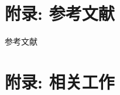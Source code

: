 \appendix

\section{附录: 参考文献}

\begin{frame}[t, allowframebreaks]{参考文献}
\renewcommand*{\bibfont}{\footnotesize}
  \nocite{*}
  \printbibliography
\end{frame}
\section{附录: 相关工作}
\hypertarget{appendix}{}


